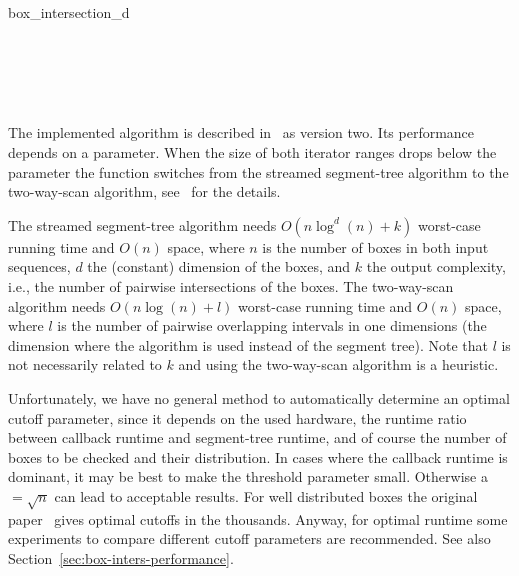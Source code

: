 \begin{ccRefFunction}{box_intersection_d}
\ccSeeAlso

\\

\\
\\

%
%

\ccImplementation

The implemented algorithm is described in~\cite{cgal:ze-fsbi-02} as
version two.  Its performance depends on a  parameter.
When the size of both iterator ranges drops below the 
parameter the function switches from the streamed segment-tree
algorithm to the two-way-scan algorithm, see~\cite{cgal:ze-fsbi-02}
for the details.

The streamed segment-tree algorithm needs $O(n \log^d (n) + k)$
worst-case running time and $O(n)$ space, where $n$ is the number of
boxes in both input sequences, $d$ the (constant) dimension of the
boxes, and $k$ the output complexity, i.e., the number of pairwise
intersections of the boxes. The two-way-scan algorithm needs $O(n \log
(n) + l)$ worst-case running time and $O(n)$ space, where $l$ is the
number of pairwise overlapping intervals in one dimensions (the
dimension where the algorithm is used instead of the segment tree).
Note that $l$ is not necessarily related to $k$ and using the
two-way-scan algorithm is a heuristic.

Unfortunately, we have no general method to automatically determine an
optimal cutoff parameter, since it depends on the used hardware, the
runtime ratio between callback runtime and segment-tree runtime, and
of course the number of boxes to be checked and their distribution. In
cases where the callback runtime is dominant, it may be best to make
the threshold parameter small. Otherwise a $=\sqrt{n}$ can
lead to acceptable results. For well distributed boxes the original
paper~\cite{cgal:ze-fsbi-02} gives optimal cutoffs in the thousands.
Anyway, for optimal runtime some experiments to compare different
cutoff parameters are recommended. See also
Section~\ref{sec:box-inters-performance}.


\end{ccRefFunction}
